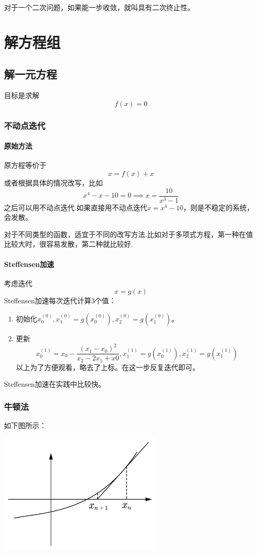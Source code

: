 对于一个二次问题，如果能一步收敛，就叫具有二次终止性。
\section{解方程组}
\subsection{解一元方程}
目标是求解
$$f(x)=0$$
\subsubsection{不动点迭代}
\paragraph*{原始方法}
原方程等价于
$$x=f(x)+x$$
或者根据具体的情况改写，比如
$$x^4-x-10=0\implies x=\frac{10}{x^3-1}$$
之后可以用不动点迭代.如果直接用不动点迭代$x=x^4-10$，则是不稳定的系统，会发散。

对于不同类型的函数，适宜于不同的改写方法.比如对于多项式方程，第一种在值比较大时，很容易发散，第二种就比较好.

\paragraph*{Steffensen加速}考虑迭代
$$x=g(x)$$
Steffensen加速每次迭代计算3个值：
\begin{enumerate}
\item 初始化$x_0^{(0)},x_1^{(0)}=g(x_0^{(0)}),x_2^{(0)}=g(x_1^{(0)})$。
\item 更新
$$x_0^{(1)}=x_0-\frac{(x_1-x_0)^2}{x_2-2x_1+x0}, x_1^{(1)}=g(x_0^{(1)}),x_2^{(1)}=g(x_1^{(1)})$$
以上为了方便观看，略去了上标。在这一步反复迭代即可。
\end{enumerate}
Steffensen加速在实践中比较快。
\subsubsection{牛顿法}
如下图所示：

\begin{center}
\includegraphics[width=8cm]{figure/Newton1D.png}
\end{center}

